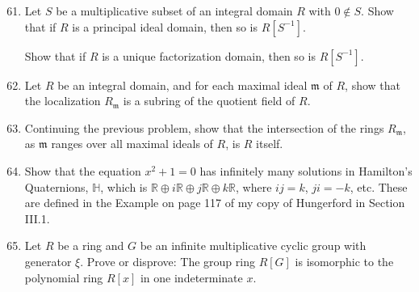 \documentclass[12pt]{article}
\newcommand{\HH}{{\mathbb H}}
\newcommand{\RR}{{\mathbb R}}
\begin{document}
\normalsize
\begin{enumerate}
\setcounter{enumi}{60}  %
 

%
\item       Let $S$ be a multiplicative subset of an integral domain $R$ with $0\not\in S$.
       Show that if $R$ is a principal ideal domain, then so is $R[S^{-1}]$.

       Show that if $R$ is a unique factorization domain, then so is $R[S^{-1}]$.
\vspace{-2pt}


%
\item
      Let $R$ be an integral domain, and for each  maximal ideal $\mathfrak{m}$ of $R$, show that the localization
  $R_{\mathfrak m}$ is a subring of the quotient field of $R$.
\vspace{-2pt}

%
\item 
    Continuing the previous problem, show that the intersection of the rings $R_{\mathfrak m}$, as ${\mathfrak m}$
  ranges over all maximal ideals of $R$, is $R$ itself.
\vspace{-2pt}


%
\item  Show that the equation $x^2+1=0$ has infinitely many solutions in Hamilton's Quaternions,
       $\HH$, which is $\RR\oplus i\RR\oplus j\RR\oplus k\RR$, where $ij=k$, $ji=-k$, etc.
       These are defined in the Example on page 117 of my copy of Hungerford in Section III.1.
\vspace{-2pt}
     
\item     Let $R$ be a  ring and $G$ be an infinite multiplicative cyclic group with generator $\xi$.
       Prove or disprove:  The group ring $R[G]$ is isomorphic to the polynomial ring $R[x]$ in one indeterminate $x$.
 

\end{enumerate}
\end{document}
